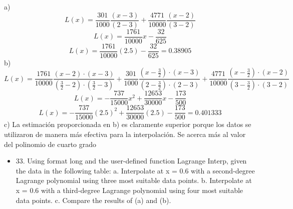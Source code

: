 \documentclass{article}
\begin{document}
a)
\begin{equation*}
    L(x) = \frac{301}{1000}\frac{(x-3)}{(2-3)}+\frac{4771}{10000}\frac{(x-2)}{(3-2)}   
\end{equation*}
\begin{equation*}
    L(x) = \frac{1761}{10000}x-\frac{32}{625}    
\end{equation*}
\begin{equation*}
    L(x) = \frac{1761}{10000}(2.5)-\frac{32}{625}=\boxed{0.38905}   
\end{equation*}
b)
\begin{equation*}
    L(x) = \frac{1761}{10000}\frac{(x-2) \cdot (x-3)}{(\frac{3}{2}-2) \cdot (\frac{3}{2}-3)}+\frac{301}{1000}\frac{(x-\frac{3}{2}) \cdot (x-3)}{(2-\frac{3}{2}) \cdot (2-3)}+\frac{4771}{10000}\frac{(x-\frac{3}{2}) \cdot (x-2)}{(3-\frac{3}{2}) \cdot (3-2)}    
\end{equation*}
\begin{equation*}
    L(x) = -\frac{737}{15000}x^2+\frac{12653}{30000}x-\frac{173}{500}    
\end{equation*}
\begin{equation*}
    L(x) = -\frac{737}{15000}(2.5)^2+\frac{12653}{30000}(2.5)-\frac{173}{500}=\boxed{0.401333}
\end{equation*}
c) La estimación proporcionada en b) es claramente superior porque los datos se utilizaron de manera más efectiva para la interpolación. Se acerca más al valor del polinomio de cuarto grado 
\newpage
\begin{itemize}
    \item 33. Using format long and the user-defined function Lagrange
          Interp, given the data in the following table:
          \newline a. Interpolate at x = 0.6 with a second-degree Lagrange polynomial
          using three most suitable data points.
          \newline  b. Interpolate at x = 0.6 with a third-degree Lagrange polynomial
          using four most suitable data points.
          \newline c. Compare the results of (a) and (b).
\end{itemize}
\end{document}
